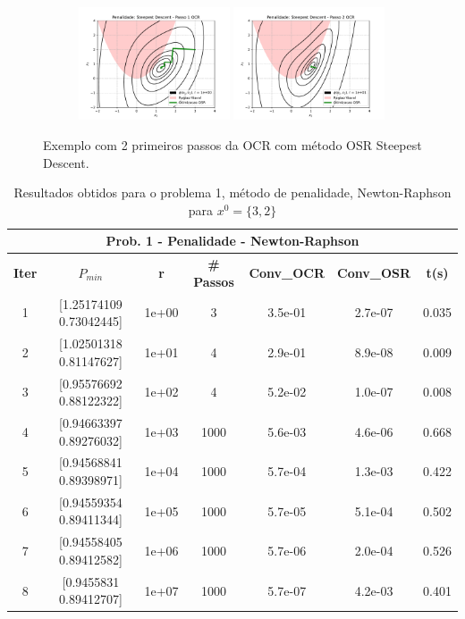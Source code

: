 \documentclass[10pt, a4paper]{article}
\begin{document}
\begin{figure}[H]
  \centering
  \begin{subfigure}[b]{\textwidth}
    \includegraphics[width=0.49\textwidth]{fig_p1/Penalidade_Steepest Descent_1.pdf}
    \includegraphics[width=0.49\textwidth]{fig_p1/Penalidade_Steepest Descent_2.pdf}
  \end{subfigure}
  \caption{Exemplo com 2 primeiros passos da OCR com método OSR Steepest Descent. }
\end{figure}

\vspace{5mm}
\begin{table}[H]
  \begin{center}
    \begin{tabular}{c|c|c|c|c|c|c}
      \multicolumn{7}{c}{\textbf{Prob. 1 - Penalidade - Newton-Raphson}}\\
      \hline
      \textbf{Iter} & \textbf{$P_{min}$} & \textbf{r} & \textbf{\# Passos} & \textbf{Conv\_OCR} & \textbf{Conv\_OSR} & \textbf{t(s)}\\
      \hline
        1& [1.25174109 0.73042445]& 1e+00& 3& 3.5e-01& 2.7e-07& 0.035     \\
        2& [1.02501318 0.81147627]& 1e+01& 4& 2.9e-01& 8.9e-08& 0.009\\
        3& [0.95576692 0.88122322]& 1e+02& 4& 5.2e-02& 1.0e-07& 0.008\\
        4& [0.94663397 0.89276032]& 1e+03& 1000& 5.6e-03& 4.6e-06& 0.668\\
        5& [0.94568841 0.89398971]& 1e+04& 1000& 5.7e-04& 1.3e-03& 0.422\\
        6& [0.94559354 0.89411344]& 1e+05& 1000& 5.7e-05& 5.1e-04& 0.502\\
        7& [0.94558405 0.89412582]& 1e+06& 1000& 5.7e-06& 2.0e-04& 0.526\\
        8& [0.9455831  0.89412707]& 1e+07& 1000& 5.7e-07& 4.2e-03& 0.401\\
    \end{tabular}
  \end{center}
  \caption{Resultados obtidos para o problema 1, método de penalidade, Newton-Raphson para $x^0=\{3,2\}$}
\end{table}
\end{document}

